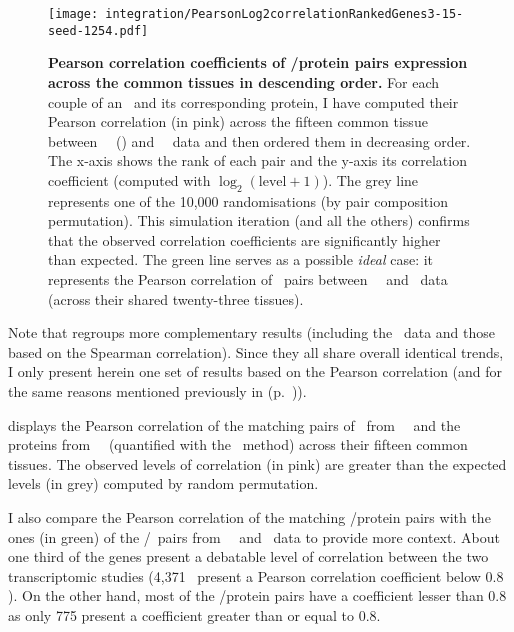 \begin{figure}[!htb]
    \texttt{[image: integration/PearsonLog2correlationRankedGenes3-15-seed-1254.pdf]}\centering
    \vspace{-2mm}
    \caption[Pearson correlation coefficients of \mRNA/protein pairs expression
    across the common tissues in descending order]
    {\label{fig:GeneProtCor}\textbf{Pearson correlation coefficients of \mRNA/protein
    pairs expression across the common tissues in descending order.}
    For each couple of an \mRNA\ and its corresponding protein,
    I have computed their Pearson correlation (in pink)
    across the fifteen common tissue
    between \pandey\ \etal\ (\PPKM) and \uhlen\ \etal\ data
    and then ordered them in decreasing order.
    The x-axis shows the rank of each pair
    and the y-axis its correlation coefficient
    (computed with $\log_2(\text{level}+1)$).
    The grey line represents one of the 10,000 randomisations
    (by pair composition permutation).
    This simulation iteration (and all the others) confirms
    that the observed correlation coefficients are
    significantly higher than expected.
    The green line serves as a possible \emph{ideal} case:
    it represents the Pearson correlation of \mRNAs\ pairs
    between \uhlen\ \etal\ and \gtex\ data
    (across their shared twenty-three tissues).
    }
    \vspace{-1em}
\end{figure}

Note that  regroups more complementary results
(including the \gtex\ data and those based on the Spearman correlation).
Since they all share overall identical trends,
I only present herein one set of results based on the Pearson correlation
(and for the same reasons mentioned previously in 
(p.~\pageref{seg:pearOverSpear})).

 displays the Pearson correlation
of the matching pairs of \mRNAs\ from \uhlen\ \etal\
and the proteins from \pandey\ \etal\ (quantified with the \PPKM\ method)
across their fifteen common tissues.
The observed levels of correlation (in pink)  are greater
than the expected levels (in grey) computed by random permutation.

I also compare the Pearson correlation of the matching \mRNAs/protein pairs
with the ones (in green) of the \mRNAs{}/\mRNAs\ pairs
from \uhlen\ \etal\ and \gtex\ data
to provide more context.
About one third of the genes present a debatable level of correlation
between the two transcriptomic studies
(4,371 \mRNAs\ present a Pearson correlation coefficient below $0.8$).
On the other hand, most of the \mRNA/protein pairs have a coefficient
lesser than $0.8$ as only 775 present
a coefficient greater than or equal to $0.8$.


